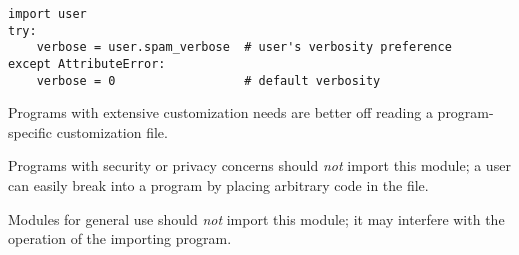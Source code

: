 \begin{verbatim}
import user
try:
    verbose = user.spam_verbose  # user's verbosity preference
except AttributeError:
    verbose = 0                  # default verbosity
\end{verbatim}

Programs with extensive customization needs are better off reading a
program-specific customization file.

Programs with security or privacy concerns should \emph{not} import
this module; a user can easily break into a program by placing
arbitrary code in the  file.

Modules for general use should \emph{not} import this module; it may
interfere with the operation of the importing program.

\begin{seealso}
\end{seealso}
